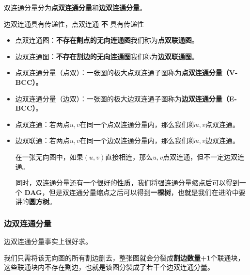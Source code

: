 \documentclass[]{article}
\begin{document}
双连通分量分为\textbf{点双连通分量}和\textbf{边双连通分量}。

边双连通具有传递性，点双连通 \textbf{不} 具有传递性

\begin{itemize}
\item
  点双连通图：\textbf{不存在割点的无向连通图}我们称为\textbf{点双联通图}。
\item
  边双连通图：\textbf{不存在割边的无向连通图}我们称为\textbf{边双联通图}。
\item
  点双连通分量（点双）：一张图的极大点双连通子图称为\textbf{点双连通分量（V-BCC）。}
\item
  边双连通分量（边双）：一张图的极大边双连通子图称为\textbf{边双连通分量（E-BCC）}。
\item
  点双连通：若两点\(u,v\)在同一个点双连通分量内，那么我们称\(u,v\)点双连通。
\item
  边双联通：若两点\(u,v\)在同一个边双连通分量内，那么我们称\(u,v\)边双连通。

  在一张无向图中，如果\((u,v)\)直接相连，那么\(u,v\)点双连通，但不一定边双连通。

  同时，双连通分量还有一个很好的性质，我们将强连通分量缩点后可以得到一个
  \textbf{DAG}，但是双连通分量缩点之后可以得到\textbf{一棵树}，也就是我们在进阶中要讲的\textbf{圆方树}。
\end{itemize}

\hypertarget{ux8fb9ux53ccux8fdeux901aux5206ux91cf}{%
\subsubsection{边双连通分量}\label{ux8fb9ux53ccux8fdeux901aux5206ux91cf}}

边双连通分量事实上很好求。

我们只需将该无向图的所有割边删去，整张图就会分裂成\textbf{割边数量+1}个联通块，这些联通块内不存在割边，也就是该图分裂成了若干个边双连通分量。
\end{document}

